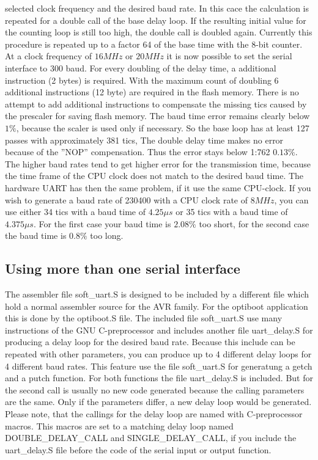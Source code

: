 selected clock frequency and the desired baud rate.
In this cace the calculation is repeated for a double call of the base delay loop.
If the resulting initial value for the counting loop is still too high, the double call is doubled again.
Currently this procedure is repeated up to a factor 64 of the base time with the 8-bit counter.
At a clock frequency of \(16 MHz\) or \(20 MHz\) it is now possible to set the serial interface to 300 baud.
For every doubling of the delay time, a additional instruction (2 bytes) is required.
With the maximum count of doubling 6 additional instructions (12 byte) are required in the flash memory.
There is no attempt to add additional instructions to compensate the missing tics caused by
the prescaler for saving flash memory.
The baud time error remains clearly below \(1\%\), because the scaler is used only if necessary.
So the base loop has at least 127 passes with approximately 381 tics, The double delay time
makes no error because of the ''NOP'' compensation. Thus the error stays below 1:762 \(0.13\%\). 
The higher baud rates tend to get higher error for the transmission time, because
the time frame of the CPU clock does not match to the desired baud time.
The hardware UART has then the same problem, if it use the same CPU-clock.
If you wish to generate a baud rate of 230400 with a CPU clock rate of \(8 MHz\),
you can use either 34 tics with a baud time of \(4.25\mu s\) or
35 tics with a baud time of \(4.375\mu s\).
For the first case your baud time is \(2.08\%\) too short, for the
second case the baud time is \(0.8\%\) too long.

\subsection{Using more than one serial interface}

The assembler file soft\_uart.S is designed to be included by a different file which hold
a normal assembler source for the AVR family.
For the optiboot application this is done by the optiboot.S file.
The included file soft\_uart.S use many instructions of the
GNU C-preprocessor and includes another file uart\_delay.S for producing a delay loop
for the desired baud rate. Because this include can be repeated with other parameters,
you can produce up to 4 different delay loops for 4 different baud rates.
This feature use the file soft\_uart.S for generatung a getch and a putch function.
For both functions the file uart\_delay.S is included. But for the second call is
usually no new code generated because the calling parameters are the same.
Only if the parameters differ, a new delay loop would be generated.
Please note, that the callings for the delay loop are named with C-preprocessor macros.
This macros are set to a matching delay loop named DOUBLE\_DELAY\_CALL and SINGLE\_DELAY\_CALL,
if you include the uart\_delay.S file before the code of the serial input or output function.

